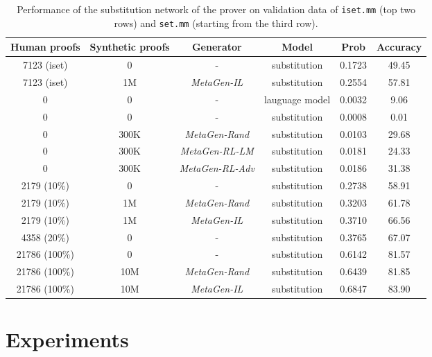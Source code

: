 \documentclass{article}
\begin{document}
\begin{table*}[t]
\caption{Performance of the substitution network of the prover on validation data of \texttt{iset.mm} (top two rows) and \texttt{set.mm} (starting from the third row).}
\label{table:generation}
\begin{center}
\begin{small}
\begin{sc}
\begin{tabular}{c c c c c c}
\toprule
\multicolumn{1}{c}{\bf Human proofs } 
&\multicolumn{1}{c}{\bf Synthetic proofs } 
&\multicolumn{1}{c}{\bf Generator}
&\multicolumn{1}{c}{\bf Model}
&\multicolumn{1}{c}{\bf Prob}
&\multicolumn{1}{c}{\bf Accuracy}
\\ \midrule
7123 (iset) & 0 & - & substitution & 0.1723 & 49.45 \\
7123 (iset) & 1M & \textit{MetaGen-IL} & substitution & 0.2554 & 57.81 \\
\midrule 
0 & 0&- & lauguage model & 0.0032 & 9.06 \\
0 & 0&- &substitution & 0.0008 & 0.01 \\
0 & 300K &\textit{MetaGen-Rand}& substitution & 0.0103  &  29.68  \\
0 & 300K &\textit{MetaGen-RL-LM}& substitution & 0.0181  &  24.33  \\ 
0 & 300K &\textit{MetaGen-RL-Adv}& substitution & 0.0186  &  31.38  \\ \midrule
2179 (10\%) & 0 & -&  substitution& 0.2738  & 58.91  \\
2179 (10\%) & 1M&\textit{MetaGen-Rand}&substitution & 0.3203 & 61.78 \\
2179 (10\%)& 1M&\textit{MetaGen-IL}& substitution& 0.3710 & 66.56  \\ 
4358 (20\%) & 0 & -&  substitution& 0.3765  & 67.07  \\
\midrule
21786 (100\%)&0 & -&  substitution& 0.6142 &81.57  \\
21786 (100\%)& 10M&\textit{MetaGen-Rand}&substitution & 0.6439 & 81.85 \\
21786 (100\%)& 10M & \textit{MetaGen-IL}& substitution & 0.6847 & 83.90  \\
\bottomrule
\end{tabular}
\end{sc}
\end{small}
\end{center}
\vskip -0.1in
\end{table*}


\section{Experiments}
\end{document}

